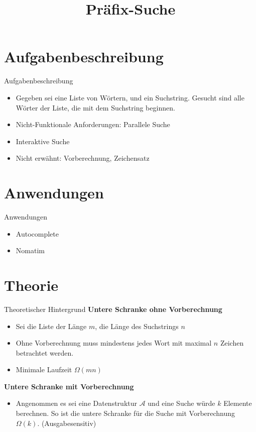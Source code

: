 \documentclass[11pt, xcolor=dvipsnames]{beamer}
\title{Präfix-Suche}
\begin{document}
	\maketitle
	
	\section{Aufgabenbeschreibung}
	\begin{frame}{Aufgabenbeschreibung}
		\begin{itemize}
			\item Gegeben sei eine Liste von Wörtern, und ein Suchstring. Gesucht sind alle Wörter der Liste, die mit dem Suchstring beginnen.
			
			\item Nicht-Funktionale Anforderungen: Parallele Suche
			\item Interaktive Suche
			\item Nicht erwähnt: Vorberechnung, Zeichensatz
		\end{itemize}
	\end{frame}
	\section{Anwendungen}
	\begin{frame}{Anwendungen}
		\begin{itemize}
			\item Autocomplete
			\item Nomatim
		\end{itemize}
	\end{frame}
	\section{Theorie}
	\begin{frame}{Theoretischer Hintergrund}
	\textbf{Untere Schranke ohne Vorberechnung}
		\begin{itemize}
			\item Sei die Liste der Länge $m$, die Länge des Suchstrings $n$
			\item Ohne Vorberechnung muss mindestens jedes Wort mit maximal $n$ Zeichen betrachtet werden.
			\item Minimale Laufzeit $\Omega(mn)$
		\end{itemize}
		\textbf{Untere Schranke mit Vorberechnung}
		\begin{itemize}
			\item Angenommen es sei eine Datenstruktur $\mathcal{A}$ und eine Suche würde $k$ Elemente berechnen. So ist die untere Schranke für die Suche mit Vorberechnung $\Omega(k)$. (Ausgabesensitiv)	
		\end{itemize}
	\end{frame}
\end{document}
